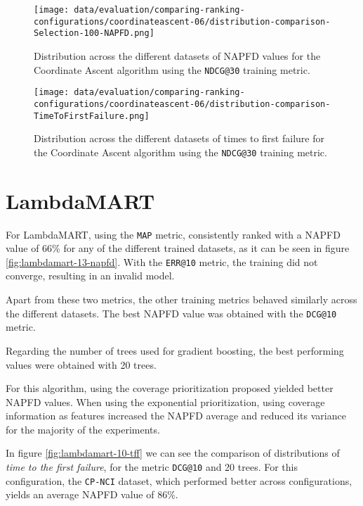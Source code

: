 \begin{figure}
    \centering
    \begin{minipage}{.45\textwidth}
        \centering
        \label{fig:coordinate-ascent-06-napfd}
        \texttt{[image: data/evaluation/comparing-ranking-configurations/coordinateascent-06/distribution-comparison-Selection-100-NAPFD.png]}
        \parbox{0.9\textwidth}{\caption{Distribution across the different datasets of NAPFD values for the Coordinate Ascent algorithm using the \texttt{NDCG@30} training metric.}}
    \end{minipage}%
    \begin{minipage}{.45\textwidth}
        \centering
        \label{fig:coordinate-ascent-06-tff}
        \texttt{[image: data/evaluation/comparing-ranking-configurations/coordinateascent-06/distribution-comparison-TimeToFirstFailure.png]}
        \parbox{0.9\textwidth}{\caption{Distribution across the different datasets of times to first failure for the Coordinate Ascent algorithm using the \texttt{NDCG@30} training metric.}}
    \end{minipage}%
\end{figure}

\section{LambdaMART}
For LambdaMART, using the \texttt{MAP} metric, consistently ranked with a NAPFD value of 66\% for any of the different 
trained datasets, as it can be seen in figure \ref{fig:lambdamart-13-napfd}. With the \texttt{ERR@10} metric, the training did not converge, resulting in an invalid model.

Apart from these two metrics, the other training metrics behaved similarly across the different datasets. The best NAPFD
value was obtained with the \texttt{DCG@10} metric.

Regarding the number of trees used for gradient boosting, the best performing values were obtained with 20 trees.

For this algorithm, using the coverage prioritization proposed yielded better NAPFD values. When using the exponential prioritization,
using coverage information as features increased the NAPFD average and reduced its variance for the majority of the experiments.

In figure \ref{fig:lambdamart-10-tff} we can see the comparison of distributions of \emph{time to the first failure},
for the metric \texttt{DCG@10} and 20 trees. For this configuration, the \texttt{CP-NCI} dataset,
which performed better across configurations, yields an average NAPFD value of 86\%.

